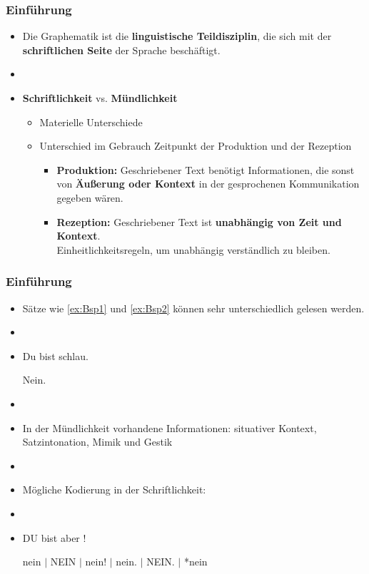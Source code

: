 \begin{frame}
\frametitle{Einführung}

\begin{itemize}
	\item Die Graphematik ist die \textbf{linguistische Teildisziplin}, die sich mit der \textbf{schriftlichen Seite} der Sprache beschäftigt. 
	\item[]
	\item \textbf{Schriftlichkeit} vs. \textbf{Mündlichkeit}
	
	\begin{itemize}
		\item Materielle Unterschiede
		\item Unterschied im Gebrauch \ras Zeitpunkt der Produktion und der Rezeption
		
		\begin{itemize}
			\item  \textbf{Produktion:} Geschriebener Text benötigt Informationen, die sonst von \textbf{Äußerung oder Kontext} in der gesprochenen Kommunikation gegeben wären.
			\item \textbf{Rezeption:} Geschriebener Text ist \textbf{unabhängig von Zeit und Kontext}.\\
			\ras Einheitlichkeitsregeln, um unabhängig verständlich zu bleiben.
		\end{itemize}

	\end{itemize} 

\end{itemize}

\end{frame}


\begin{frame}
\frametitle{Einführung}

\begin{itemize}
	\item Sätze wie \ref{ex:Bsp1} und \ref{ex:Bsp2} können sehr unterschiedlich gelesen werden.
	\item[]
	\item[]
		
	  \ea\label{ex:Bsp1}
          Du bist schlau.
          \z

	  \ea\label{ex:Bsp2}
          Nein.
          \z
\pause		
	\item[]
	\item In der Mündlichkeit vorhandene Informationen: situativer Kontext, Satzintonation, Mimik und Gestik
	\item[]
	\item Mögliche Kodierung in der Schriftlichkeit:
	\item[]
	\item[]
		
	  \ea
          DU bist aber !
          \z
	  
	  \ea
          nein $|$ NEIN $|$ nein! $|$ nein. $|$ NEIN. $|$ *nein
          \z

\end{itemize}		

\end{frame}



